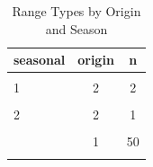 \begin{table}[!h]
\centering
\caption{Range Types by Origin and Season}
\centering
\begin{tabular}[t]{lcc}
\toprule
seasonal & origin & n\\
\midrule
\cellcolor{gray!10}{1} & \cellcolor{gray!10}{1} & \cellcolor{gray!10}{156}\\
1 & 2 & 2\\
\cellcolor{gray!10}{2} & \cellcolor{gray!10}{1} & \cellcolor{gray!10}{142}\\
2 & 2 & 1\\
\cellcolor{gray!10}{3} & \cellcolor{gray!10}{1} & \cellcolor{gray!10}{127}\\
\addlinespace
4 & 1 & 50\\
\cellcolor{gray!10}{4} & \cellcolor{gray!10}{2} & \cellcolor{gray!10}{1}\\
\bottomrule
\end{tabular}
\end{table}